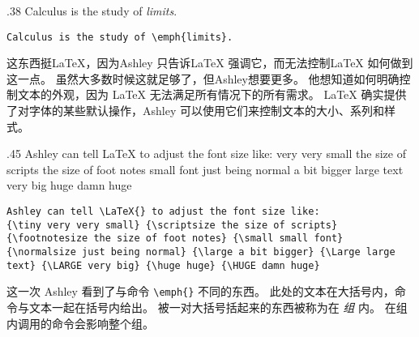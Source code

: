 \begin{parexammar}{.38\textandmarginlen}{
Calculus is the study of \emph{limits}.
}
\begin{lstlisting}
Calculus is the study of \emph{limits}.
\end{lstlisting}
\end{parexammar}

这东西挺\LaTeX，因为Ashley 只告诉\LaTeX{} 强调它，而无法控制\LaTeX{} 如何做到这一点。 虽然大多数时候这就足够了，但Ashley想要更多。 他想知道如何明确控制文本的外观，因为 \LaTeX{} 无法满足所有情况下的所有需求。 \LaTeX{} 确实提供了对字体的某些默认操作，Ashley 可以使用它们来控制文本的大小、系列和样式。
\begin{parexammar}{.45\textandmarginlen}{
Ashley can tell \LaTeX{} to adjust the font size like:
{\tiny very very small} {\scriptsize the size of scripts} {\footnotesize the size of foot notes} {\small small font} {\normalsize just being normal} {\large a bit bigger} {\Large large text} {\LARGE very big} {\huge huge} {\Huge damn huge}
}
\begin{lstlisting}
Ashley can tell \LaTeX{} to adjust the font size like:
{\tiny very very small} {\scriptsize the size of scripts} {\footnotesize the size of foot notes} {\small small font} {\normalsize just being normal} {\large a bit bigger} {\Large large text} {\LARGE very big} {\huge huge} {\HUGE damn huge}
\end{lstlisting}
\end{parexammar}
这一次 Ashley 看到了与命令 \verb=\emph{}= 不同的东西。 此处的文本在大括号内，命令与文本一起在括号内给出。 被一对大括号括起来的东西被称为在 \emph{组} 内。 在组内调用的命令会影响整个组。

